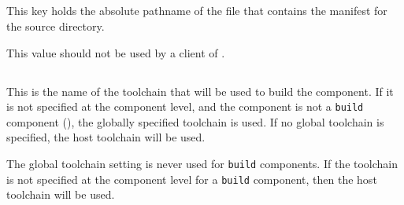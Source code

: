 
\subsection{}\label{variables:source-mtree-manifest}

This key holds the absolute pathname of the file that contains the
\mtree manifest for the source directory.

This value should not be used by a client of \lmsbw.


\subsection{}\label{variables:toolchain}

This is the name of the toolchain that will be used to build the
component.  If it is not specified at the component level, and the
component is not a \texttt{build} component (),
the globally specified toolchain is used.  If no global toolchain is
specified, the host toolchain will be used.

The global toolchain setting is never used for \texttt{build}
components.  If the toolchain is not specified at the component level
for a \texttt{build} component, then the host toolchain will be used.

